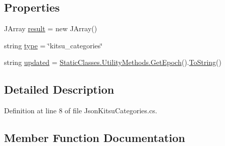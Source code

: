\subsection*{Properties}
\begin{DoxyCompactItemize}
\item 
J\+Array \mbox{\hyperlink{class_little_weeb_library_1_1_models_1_1_json_kistu_categories_a9060b93b9300d3a6508ccd8c3bf34cd1}{result}} = new J\+Array()
\item 
string \mbox{\hyperlink{class_little_weeb_library_1_1_models_1_1_json_kistu_categories_a0f0d3599277419092a6127c8c66849e0}{type}} = \char`\"{}kitsu\+\_\+categories\char`\"{}
\item 
string \mbox{\hyperlink{class_little_weeb_library_1_1_models_1_1_json_kistu_categories_a6ffcd8f9641f421eec961847365f5cb2}{updated}} = \mbox{\hyperlink{class_little_weeb_library_1_1_static_classes_1_1_utility_methods_a12336d9e64983ddabaad8950486fafb2}{Static\+Classes.\+Utility\+Methods.\+Get\+Epoch}}().\mbox{\hyperlink{class_little_weeb_library_1_1_models_1_1_json_kistu_categories_af972fa0332070ba294c5117b95836aa4}{To\+String}}()
\end{DoxyCompactItemize}


\subsection{Detailed Description}


Definition at line 8 of file Json\+Kitsu\+Categories.\+cs.



\subsection{Member Function Documentation}
\mbox{\label{class_little_weeb_library_1_1_models_1_1_json_kistu_categories_aaab94c1dc228770f7bf0b66f4a47fd54}} 
